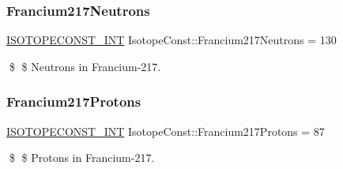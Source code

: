 \subsubsection{\texorpdfstring{Francium217\+Neutrons}{Francium217Neutrons}}
{\footnotesize\ttfamily \mbox{\hyperlink{group___isotope_const-_macros_ga5f18360b3e99483a35c32d789e62621c}{I\+S\+O\+T\+O\+P\+E\+C\+O\+N\+S\+T\+\_\+\+I\+NT}} Isotope\+Const\+::\+Francium217\+Neutrons = 130}

\$ \$ Neutrons in Francium-\/217. \mbox{\label{group___isotope_const-_francium-_fr217_gaf6d8392b1b57ecaf8941ea2f366a69a8}} 
\subsubsection{\texorpdfstring{Francium217\+Protons}{Francium217Protons}}
{\footnotesize\ttfamily \mbox{\hyperlink{group___isotope_const-_macros_ga5f18360b3e99483a35c32d789e62621c}{I\+S\+O\+T\+O\+P\+E\+C\+O\+N\+S\+T\+\_\+\+I\+NT}} Isotope\+Const\+::\+Francium217\+Protons = 87}

\$ \$ Protons in Francium-\/217. 